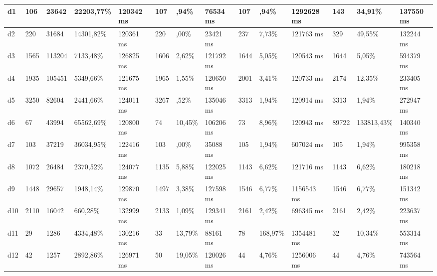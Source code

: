 \begin{table}[]
\begin{adjustbox}{angle=90}
{\begin{tabular}{|c|c|l|l|l|l|l|l|l|l|l|l|l|l|}
\multicolumn{1}{|l|}{d1} & \multicolumn{1}{l|}{106} &23642 & 22203,77\% & 120342 ms  & 107 & ,94\% & 76534 ms  & 107 & ,94\% & 1292628 ms  & 143 & 34,91\% & 137550 ms \\ \hline
\multicolumn{1}{|l|}{d2} & \multicolumn{1}{l|}{220} &31684 & 14301,82\% & 120361 ms  & 220 & ,00\% & 23421 ms  & 237 & 7,73\% & 121763 ms  & 329 & 49,55\% & 132244 ms \\ \hline
\multicolumn{1}{|l|}{d3} & \multicolumn{1}{l|}{1565} &113204 & 7133,48\% & 126825 ms  & 1606 & 2,62\% & 121792 ms  & 1644 & 5,05\% & 120543 ms  & 1644 & 5,05\% & 594379 ms \\ \hline
\multicolumn{1}{|l|}{d4} & \multicolumn{1}{l|}{1935} &105451 & 5349,66\% & 121675 ms  & 1965 & 1,55\% & 120650 ms  & 2001 & 3,41\% & 120733 ms  & 2174 & 12,35\% & 233405 ms \\ \hline
\multicolumn{1}{|l|}{d5} & \multicolumn{1}{l|}{3250} &82604 & 2441,66\% & 124011 ms  & 3267 & ,52\% & 135046 ms  & 3313 & 1,94\% & 120914 ms  & 3313 & 1,94\% & 272947 ms \\ \hline
\multicolumn{1}{|l|}{d6} & \multicolumn{1}{l|}{67} &43994 & 65562,69\% & 120800 ms  & 74 & 10,45\% & 106206 ms  & 73 & 8,96\% & 120943 ms  & 89722 & 133813,43\% & 140340 ms \\ \hline
\multicolumn{1}{|l|}{d7} & \multicolumn{1}{l|}{103} &37219 & 36034,95\% & 122416 ms  & 103 & ,00\% & 35088 ms  & 105 & 1,94\% & 607024 ms  & 105 & 1,94\% & 995358 ms \\ \hline
\multicolumn{1}{|l|}{d8} & \multicolumn{1}{l|}{1072} &26484 & 2370,52\% & 124077 ms  & 1135 & 5,88\% & 122025 ms  & 1143 & 6,62\% & 121716 ms  & 1143 & 6,62\% & 180218 ms \\ \hline
\multicolumn{1}{|l|}{d9} & \multicolumn{1}{l|}{1448} &29657 & 1948,14\% & 129870 ms  & 1497 & 3,38\% & 127598 ms  & 1546 & 6,77\% & 1156543 ms  & 1546 & 6,77\% & 151342 ms \\ \hline
\multicolumn{1}{|l|}{d10} & \multicolumn{1}{l|}{2110} &16042 & 660,28\% & 132999 ms  & 2133 & 1,09\% & 129341 ms  & 2161 & 2,42\% & 696345 ms  & 2161 & 2,42\% & 223637 ms \\ \hline
\multicolumn{1}{|l|}{d11} & \multicolumn{1}{l|}{29} &1286 & 4334,48\% & 130216 ms  & 33 & 13,79\% & 88161 ms  & 78 & 168,97\% & 1354481 ms  & 32 & 10,34\% & 553314 ms \\ \hline
\multicolumn{1}{|l|}{d12} & \multicolumn{1}{l|}{42} &1257 & 2892,86\% & 126971 ms  & 50 & 19,05\% & 120026 ms  & 44 & 4,76\% & 1256006 ms  & 44 & 4,76\% & 743564 ms \\ \hline

\end{tabular}}
\end{adjustbox}
\end{table}
